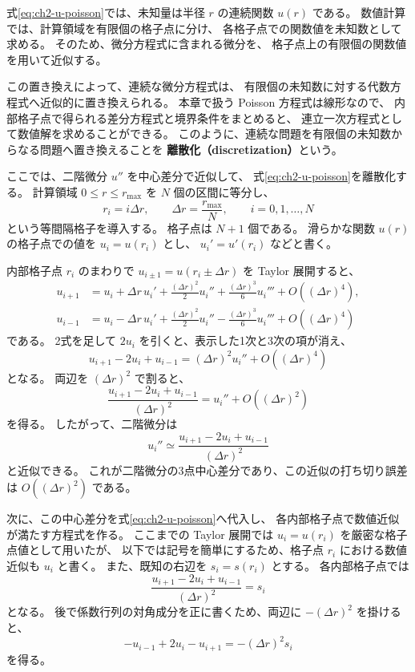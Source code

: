 式\eqref{eq:ch2-u-poisson}では、未知量は半径 $r$ の連続関数 $u(r)$ である。
数値計算では、計算領域を有限個の格子点に分け、
各格子点での関数値を未知数として求める。
そのため、微分方程式に含まれる微分を、
格子点上の有限個の関数値を用いて近似する。

この置き換えによって、連続な微分方程式は、
有限個の未知数に対する代数方程式へ近似的に置き換えられる。
本章で扱う Poisson 方程式は線形なので、
内部格子点で得られる差分方程式と境界条件をまとめると、
連立一次方程式として数値解を求めることができる。
このように、連続な問題を有限個の未知数からなる問題へ置き換えることを
\textbf{離散化（discretization）}という。

ここでは、二階微分 $u''$ を中心差分で近似して、
式\eqref{eq:ch2-u-poisson}を離散化する。
計算領域 $0\le r\le r_{\max}$ を $N$ 個の区間に等分し、
\begin{equation}
 r_i=i\Delta r,
 \qquad
 \Delta r=\frac{r_{\max}}{N},
 \qquad i=0,1,\ldots,N
\label{eq:ch2-grid}
\end{equation}
という等間隔格子を導入する。
格子点は $N+1$ 個である。
滑らかな関数 $u(r)$ の格子点での値を $u_i=u(r_i)$ とし、
$u_i'=u'(r_i)$ などと書く。

内部格子点 $r_i$ のまわりで $u_{i\pm1}=u(r_i\pm\Delta r)$ を Taylor 展開すると、
\begin{align}
 u_{i+1}&=u_i+\Delta r\,u_i'+\frac{(\Delta r)^2}{2}u_i''+\frac{(\Delta r)^3}{6}u_i'''+O((\Delta r)^4),\\
 u_{i-1}&=u_i-\Delta r\,u_i'+\frac{(\Delta r)^2}{2}u_i''-\frac{(\Delta r)^3}{6}u_i'''+O((\Delta r)^4)
\end{align}
である。
2式を足して $2u_i$ を引くと、表示した1次と3次の項が消え、
\begin{equation}
 u_{i+1}-2u_i+u_{i-1}=(\Delta r)^2u_i''+O((\Delta r)^4)
\end{equation}
となる。
両辺を $(\Delta r)^2$ で割ると、
\begin{equation}
 \frac{u_{i+1}-2u_i+u_{i-1}}{(\Delta r)^2}=u_i''+O((\Delta r)^2)
\end{equation}
を得る。
したがって、二階微分は
\begin{equation}
 \boxed{u_i''\simeq\frac{u_{i+1}-2u_i+u_{i-1}}{(\Delta r)^2}}
\label{eq:ch2-second-central}
\end{equation}
と近似できる。
これが二階微分の3点中心差分であり、この近似の打ち切り誤差は $O((\Delta r)^2)$ である。

次に、この中心差分を式\eqref{eq:ch2-u-poisson}へ代入し、
各内部格子点で数値近似が満たす方程式を作る。
ここまでの Taylor 展開では $u_i=u(r_i)$ を厳密な格子点値として用いたが、
以下では記号を簡単にするため、格子点 $r_i$ における数値近似も $u_i$ と書く。
また、既知の右辺を $s_i=s(r_i)$ とする。
各内部格子点では
\begin{equation}
 \frac{u_{i+1}-2u_i+u_{i-1}}{(\Delta r)^2}=s_i
\end{equation}
となる。
後で係数行列の対角成分を正に書くため、両辺に $-(\Delta r)^2$ を掛けると、
\begin{equation}
 \boxed{
 -u_{i-1}+2u_i-u_{i+1}
 =-(\Delta r)^2s_i
 }
\label{eq:ch2-discrete-poisson}
\end{equation}
を得る。

